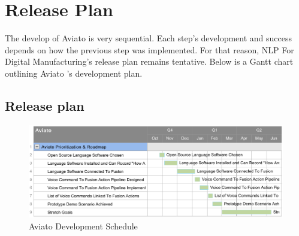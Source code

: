 \documentclass[onecolumn, draftclsnofoot,10pt, compsoc]{IEEEtran}
\def \CapstoneProjectName{NLP For Digital Manufacturing}
\def \botname{Aviato }
\begin{document}
\section{Release Plan}
	The develop of \botname is very sequential. Each step's development and success depends on how the previous step was implemented. For that reason, \CapstoneProjectName's release plan remains tentative. Below is a Gantt chart outlining \botname's development plan.
    \subsection{Release plan}
    	\begin{figure}[H]
    		\includegraphics[width=1\textwidth]{ganttChart.eps}
    		\centering
    		\caption{\botname Development Schedule}
   			\label{fig:developmentSchedule1}
    	\end{figure}


% 
%
\end{document}
